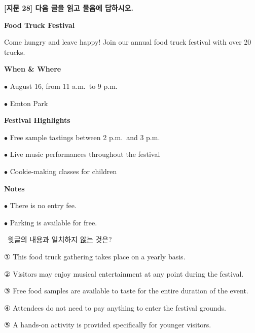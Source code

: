 \documentclass[11pt,a4paper]{article}
\newcommand{\qno}[1]{\par\vspace{8pt}\noindent{\sffamily\bfseries #1.}\ }
\newcommand{\instr}[1]{{\sffamily #1}\par\vspace{3pt}}
\begin{document}
\begin{center}
{\fontsize{15}{17}\selectfont\sffamily\bfseries [지문 28] 다음 글을 읽고 물음에 답하시오.}
\end{center}
\vspace{4pt}

\begin{pbox}
\begin{center}
{\sffamily\bfseries Food Truck Festival}
\end{center}
Come hungry and leave happy! Join our annual food truck festival with over 20 trucks.\par
\vspace{6pt}
{\sffamily\bfseries When \& Where}\par
\hspace{1em}$\bullet$ August 16, from 11 a.m.\ to 9 p.m.\par
\hspace{1em}$\bullet$ Emton Park\par
\vspace{6pt}
{\sffamily\bfseries Festival Highlights}\par
\hspace{1em}$\bullet$ Free sample tastings between 2 p.m.\ and 3 p.m.\par
\hspace{1em}$\bullet$ Live music performances throughout the festival\par
\hspace{1em}$\bullet$ Cookie-making classes for children\par
\vspace{6pt}
{\sffamily\bfseries Notes}\par
\hspace{1em}$\bullet$ There is no entry fee.\par
\hspace{1em}$\bullet$ Parking is available for free.\par
\vspace{4pt}
\noindent{}
\end{pbox}

\qno{1}\instr{윗글의 내용과 일치하지 \underline{않는} 것은?}
\begin{choices}
\item ① This food truck gathering takes place on a yearly basis.
\item ② Visitors may enjoy musical entertainment at any point during the festival.
\item ③ Free food samples are available to taste for the entire duration of the event.
\item ④ Attendees do not need to pay anything to enter the festival grounds.
\item ⑤ A hands-on activity is provided specifically for younger visitors.
\end{choices}
\end{document}
